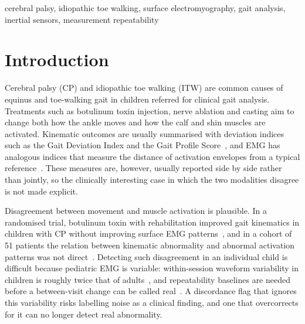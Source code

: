 \documentclass[conference]{IEEEtran}
\newcommand{\rtwo}[1]{{\color{rII}#1}}
\newcommand{\rtwo}[1]{#1}
\begin{document}
\begin{IEEEkeywords}
cerebral palsy, idiopathic toe walking, surface electromyography, gait analysis, inertial sensors, measurement repeatability
\end{IEEEkeywords}

\section{Introduction}
Cerebral palsy (CP) and idiopathic toe walking (ITW) are common causes of equinus and toe-walking gait in children referred for clinical gait analysis. Treatments such as botulinum toxin injection, nerve ablation and casting aim to change both how the ankle moves and how the calf and shin muscles are activated. Kinematic outcomes are usually summarised with deviation indices such as the Gait Deviation Index and the Gait Profile Score~\cite{schwartz2008gdi,baker2009gps}, and EMG has analogous indices that measure the distance of activation envelopes from a typical reference~\cite{davoudi2025fingerprint}. These measures are, however, usually reported side by side rather than jointly, so the clinically interesting case in which the two modalities disagree is not made explicit.

Disagreement between movement and muscle activation is plausible. In a randomised trial, botulinum toxin with rehabilitation improved gait kinematics in children with CP without improving surface EMG patterns~\cite{vanderhouwen2011btx}, and in a cohort of 51 patients the relation between kinematic abnormality and abnormal activation patterns was not direct~\cite{syczewska2016emg}. Detecting such disagreement in an individual child is difficult because pediatric EMG is variable: within-session waveform variability in children is roughly twice that of adults~\cite{granata2005repeat}, and repeatability baselines are needed before a between-visit change can be called real~\cite{steele2019repeat}. A discordance flag that ignores this variability risks labelling noise as a clinical finding, \rtwo{and one that overcorrects for it can no longer detect real abnormality.}
\end{document}
